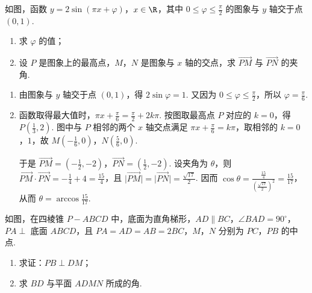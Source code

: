 \begin{problem}
如图，函数 \(y = 2\sin (\pi x + \varphi)\)，\(x \in \R\)，其中 \(0 \leqslant \varphi \leqslant \frac{\pi}{2}\) 的图象与 \(y\) 轴交于点 \((0,1)\).

\begin{enumerate}
\item 求 \(\varphi\) 的值；
\item 设 \(P\) 是图象上的最高点，\(M\)，\(N\) 是图象与 \(x\) 轴的交点，求 \(\overrightarrow{PM}\) 与 \(\overrightarrow{PN}\) 的夹角.
\end{enumerate}

\end{problem}

\begin{solution}
\begin{enumerate}
\item 由图象与 \(y\) 轴交于点 \((0,1)\)，得 \(2\sin\varphi=1\). 又因为 \(0\leqslant\varphi\leqslant\frac{\pi}{2}\)，所以 \(\varphi=\frac{\pi}{6}\).

\item 函数取得最大值时，\(\pi x+\frac{\pi}{6}=\frac{\pi}{2}+2k\pi\). 按图取最高点 \(P\) 对应的 \(k=0\)，得 \(P\left(\frac13,2\right)\). 图中与 \(P\) 相邻的两个 \(x\) 轴交点满足 \(\pi x+\frac{\pi}{6}=k\pi\)，取相邻的 \(k=0\)，\(1\)，故 \(M\left(-\frac16,0\right)\)，\(N\left(\frac56,0\right)\).

于是 \(\overrightarrow{PM}=\left(-\frac12,-2\right)\)，\(\overrightarrow{PN}=\left(\frac12,-2\right)\). 设夹角为 \(\theta\)，则 \(\overrightarrow{PM}\cdot\overrightarrow{PN}=-\frac14+4=\frac{15}{4}\)，且 \(\lvert\overrightarrow{PM}\rvert=\lvert\overrightarrow{PN}\rvert=\frac{\sqrt{17}}2\). 因而 \(\cos\theta=\frac{\frac{15}{4}}{(\frac{\sqrt{17}}{2})^2}=\frac{15}{17}\)，从而 \(\theta=\arccos\frac{15}{17}\).
\end{enumerate}
\end{solution}

\begin{problem}
如图，在四棱锥 \(P-ABCD\) 中，底面为直角梯形，\(AD \parallel BC\)，\(\angle BAD = 90^{\circ}\)，\(PA \perp\) 底面 \(ABCD\)，且 \(PA = AD = AB = 2BC\)，\(M\)，\(N\) 分别为 \(PC\)，\(PB\) 的中点.

\begin{enumerate}
\item 求证：\(PB \perp DM\)；
\item 求 \(BD\) 与平面 \(ADMN\) 所成的角.
\end{enumerate}

\end{problem}

